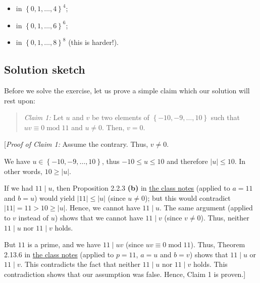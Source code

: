 \documentclass[paper=a4, fontsize=12pt]{scrartcl}%
\theoremstyle{plainsl}
\theoremstyle{definition}
\theoremstyle{remark}
\newenvironment{statement}{\begin{quote}}{\end{quote}}
\begin{document}
\begin{itemize}
\item in $\left\{  0, 1, \ldots, 4 \right\}  ^{4}$;

\item in $\left\{  0, 1, \ldots, 6 \right\}  ^{6}$;

\item in $\left\{  0, 1, \ldots, 8 \right\}  ^{8}$ (this is harder!).
\end{itemize}

\subsection{Solution sketch}

Before we solve the exercise, let us prove a simple claim which our solution
will rest upon:

\begin{statement}
\textit{Claim 1:} Let $u$ and $v$ be two elements of $\left\{  -10,-9,\ldots
,10\right\}  $ such that $uv\equiv0\operatorname{mod}11$ and $u\neq0$. Then,
$v=0$.
\end{statement}

[\textit{Proof of Claim 1:} Assume the contrary. Thus, $v\neq0$.

We have $u\in\left\{  -10,-9,\ldots,10\right\}  $, thus $-10\leq u\leq10$ and
therefore $\left\vert u\right\vert \leq10$. In other words, $10\geq\left\vert
u\right\vert $.

If we had $11\mid u$, then Proposition 2.2.3 \textbf{(b)} in
\href{http://www.cip.ifi.lmu.de/~grinberg/t/19s/notes.pdf}{the class notes}
(applied to $a=11$ and $b=u$) would yield $\left\vert 11\right\vert
\leq\left\vert u\right\vert $ (since $u\neq0$); but this would contradict
$\left\vert 11\right\vert =11>10\geq\left\vert u\right\vert $. Hence, we
cannot have $11\mid u$. The same argument (applied to $v$ instead of $u$)
shows that we cannot have $11\mid v$ (since $v\neq0$). Thus, neither $11\mid
u$ nor $11\mid v$ holds.

But $11$ is a prime, and we have $11\mid uv$ (since $uv\equiv
0\operatorname{mod}11$). Thus, Theorem 2.13.6 in
\href{http://www.cip.ifi.lmu.de/~grinberg/t/19s/notes.pdf}{the class notes}
(applied to $p=11$, $a=u$ and $b=v$) shows that $11\mid u$ or $11\mid v$. This
contradicts the fact that neither $11\mid u$ nor $11\mid v$ holds. This
contradiction shows that our assumption was false. Hence, Claim 1 is proven.]

\bigskip
\end{document}
